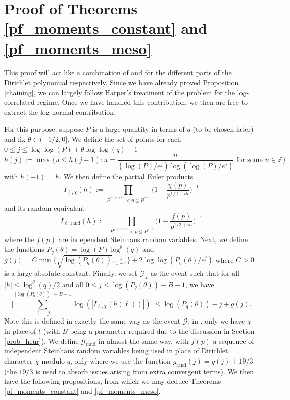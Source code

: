 \documentclass[reqno]{amsart}
\theoremstyle{definition}
\theoremstyle{remark}
\numberwithin{equation}{section}
\theoremstyle{remark}
\begin{document}
\section{Proof of Theorems \ref{pf_moments_constant} and \ref{pf_moments_meso}} \label{pfm_proof}
This proof will act like a combination of \cite{ah24} and \cite{harper2019partition} for the different parts of the Dirichlet polynomial respectively. Since we have already proved Proposition \ref{chaining}, we can largely follow Harper's treatment of the problem for the log-correlated regime. Once we have handled this contribution, we then are free to extract the log-normal contribution. \par
For this purpose, suppose $P$ is a large quantity in terms of $q$ (to be chosen later) and fix $\theta \in (-1/2,0]$. We define the set of points for each $0 \leq j \leq \log\log(P)+\theta\log\log(q)-1$
\begin{equation}
    h(j) := \max\big\{u \leq h(j-1):u=\frac{n}{(\log(P)/e^j)\log(\log(P)/e^j)} \text{ for some } n \in \mathbb{Z}\big\} \label{discrete_h}
\end{equation}
with $h(-1) = h$. We then define the partial Euler products
\begin{equation}
    I_{\ell,\chi}(h) := \prod_{P^{e^{-(\ell+1)}} < p \leq P^{e^{-\ell}}}\big(1-\frac{\chi(p)}{p^{1/2+ih}}\big)^{-1} \label{char_increment}
\end{equation}
and its random equivalent
\begin{equation}
    I_{\ell,\text{rand}}(h) :=\prod_{P^{e^{-(\ell+1)}} < p \leq P^{e^{-\ell}}}\big(1-\frac{f(p)}{p^{1/2+ih}}\big)^{-1} \label{random_increment}
\end{equation}
where the $f(p)$ are independent Steinhaus random variables. Next, we define the functions $P_q(\theta) = \log(P)\log^\theta(q)$ and $g(j) = C\min\{\sqrt{\log(P_q(\theta))},\frac{1}{1-r}\} + 2\log\log(P_q(\theta)/e^j)$ where $C>0$ is a large absolute constant. Finally, we set $\mathcal{G}_\chi$ as the event such that for all $|h| \leq \log^\theta(q)/2$ and all $0 \leq j \leq \log(P_q(\theta)) - B -1$, we have
$$\big|\sum_{\ell=j}^{\lfloor\log(P_q(\theta))\rfloor-B-1}\log(|I_{\ell,\chi}(h(\ell))|)\big|\leq \log(P_q(\theta)) - j +g(j).$$
Note this is defined in exactly the same way as the event $\mathcal{G}_t$ in \cite{harper2019partition}, only we have $\chi$ in place of $t$ (with $B$ being a parameter required due to the discussion in Section \ref{prob_heur}). We define $\mathcal{G}_{\text{rand}}$ in almost the same way, with $f(p)$ a sequence of independent Steinhaus random variables being used in place of Dirichlet character $\chi$ modulo $q$, only where we use the function $g_{\text{rand}}(j) = g(j) + 19/3$ (the $19/3$ is used to absorb issues arising from extra convergent terms). We then have the following propositions, from which we may deduce Theorems \ref{pf_moments_constant} and \ref{pf_moments_meso}.
\end{document}
